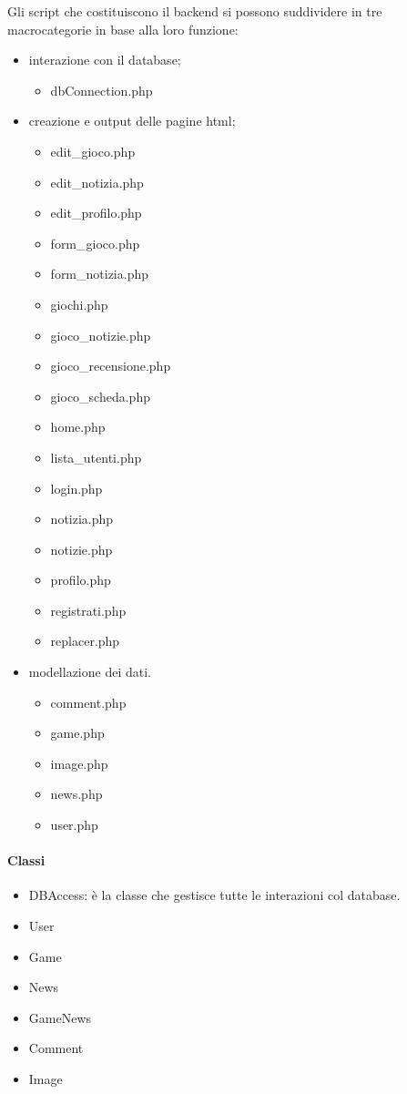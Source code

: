 Gli script che costituiscono il backend si possono suddividere in tre macrocategorie in base alla loro funzione:
\begin{itemize}
	\item interazione con il database;
	\begin{itemize}
		\item dbConnection.php
	\end{itemize}
	\item creazione e output delle pagine html;
	\begin{itemize}
		\item edit_gioco.php
		\item edit_notizia.php
		\item edit_profilo.php
		\item form_gioco.php
		\item form_notizia.php
		\item giochi.php
		\item gioco_notizie.php
		\item gioco_recensione.php
		\item gioco_scheda.php
		\item home.php
		\item lista_utenti.php
		\item login.php
		\item notizia.php
		\item notizie.php
		\item profilo.php
		\item registrati.php
		\item replacer.php
	\end{itemize}
	\item modellazione dei dati.
	\begin{itemize}
		\item comment.php
		\item game.php
		\item image.php
		\item news.php
		\item user.php
	\end{itemize}
\end{itemize}

\paragraph{Classi}
\begin{itemize}
	\item DBAccess: è la classe che gestisce tutte le interazioni col database.
	\item User
	\item Game
	\item News
	\item GameNews
	\item Comment
	\item Image
\end{itemize}

